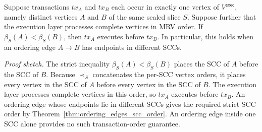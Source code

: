 \begin{corollary}
\label{cor:transaction_projection}
Suppose transactions $tx_A$ and $tx_B$ each occur in exactly one vertex of $V^{\mathsf{exec}}$, namely distinct vertices $A$ and $B$ of the same sealed slice $S$. Suppose further that the execution layer processes complete vertices in MRV order. If $\beta_S(A)<\beta_S(B)$, then $tx_A$ executes before $tx_B$. In particular, this holds when an ordering edge $A\to B$ has endpoints in different SCCs.
\end{corollary}
\noindent\emph{Proof sketch.}
The strict inequality $\beta_S(A)<\beta_S(B)$ places the SCC of $A$ before the SCC of $B$. Because $\prec_S$ concatenates the per-SCC vertex orders, it places every vertex in the SCC of $A$ before every vertex in the SCC of $B$. The execution layer processes complete vertices in this order, so $tx_A$ executes before $tx_B$. An ordering edge whose endpoints lie in different SCCs gives the required strict SCC order by Theorem~\ref{thm:ordering_edges_scc_order}. An ordering edge inside one SCC alone provides no such transaction-order guarantee.